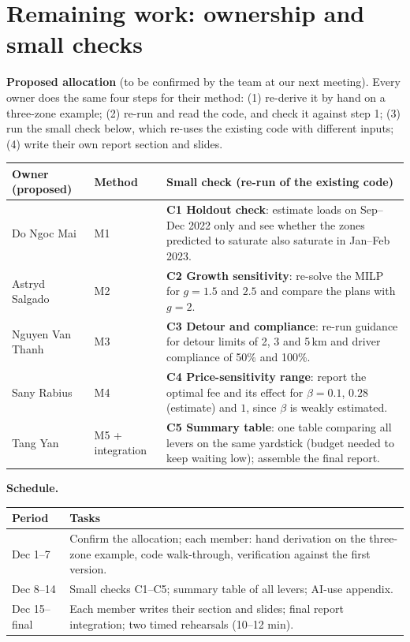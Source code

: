 \documentclass[11pt,a4paper]{article}
\begin{document}
\section{Remaining work: ownership and small checks}
\textbf{Proposed allocation} (to be confirmed by the team at our next meeting). Every owner does the same four steps for their method: (1) re-derive it by hand on a three-zone example; (2) re-run and read the code, and check it against step 1; (3) run the small check below, which re-uses the existing code with different inputs; (4) write their own report section and slides.
\begin{center}\small
\begin{tabular}{@{}>{\raggedright\arraybackslash}p{2.7cm}>{\raggedright\arraybackslash}p{1.7cm}p{11.1cm}@{}}\toprule
Owner (proposed) & Method & Small check (re-run of the existing code)\\\midrule
Do Ngoc Mai & M1 & \textbf{C1 Holdout check}: estimate loads on Sep--Dec 2022 only and see whether the zones predicted to saturate also saturate in Jan--Feb 2023.\\
Astryd Salgado & M2 & \textbf{C2 Growth sensitivity}: re-solve the MILP for $g=1.5$ and $2.5$ and compare the plans with $g=2$.\\
Nguyen Van Thanh & M3 & \textbf{C3 Detour and compliance}: re-run guidance for detour limits of 2, 3 and 5\,km and driver compliance of 50\% and 100\%.\\
Sany Rabius & M4 & \textbf{C4 Price-sensitivity range}: report the optimal fee and its effect for $\beta=0.1$, $0.28$ (estimate) and $1$, since $\beta$ is weakly estimated.\\
Tang Yan & M5 + integration & \textbf{C5 Summary table}: one table comparing all levers on the same yardstick (budget needed to keep waiting low); assemble the final report.\\\bottomrule
\end{tabular}\end{center}

\textbf{Schedule.}
\begin{center}\small
\begin{tabular}{@{}p{3cm}p{12.6cm}@{}}\toprule
Period & Tasks\\\midrule
Dec 1--7 & Confirm the allocation; each member: hand derivation on the three-zone example, code walk-through, verification against the first version.\\
Dec 8--14 & Small checks C1--C5; summary table of all levers; AI-use appendix.\\
Dec 15--final & Each member writes their section and slides; final report integration; two timed rehearsals (10--12 min).\\\bottomrule
\end{tabular}\end{center}
\end{document}
